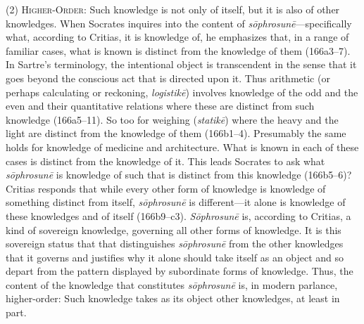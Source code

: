 (2) \textsc{Higher-Order}: Such knowledge is not only of itself, but it is also of other knowledges. When Socrates inquires into the content of \emph{sōphrosunē}—specifically what, according to Critias, it is knowledge of, he emphasizes that, in a range of familiar cases, what is known is distinct from the knowledge of them (166a3–7). In Sartre's terminology, the intentional object is transcendent in the sense that it goes beyond the conscious act that is directed upon it. Thus arithmetic (or perhaps calculating or reckoning, \emph{logistikē}) involves knowledge of the odd and the even and their quantitative relations where these are distinct from such knowledge (166a5–11). So too for weighing (\emph{statikē}) where the heavy and the light are distinct from the knowledge of them (166b1–4). Presumably the same holds for knowledge of medicine and architecture. What is known in each of these cases is distinct from the knowledge of it. This leads Socrates to ask what \emph{sōphrosunē} is knowledge of such that is distinct from this knowledge (166b5–6)? Critias responds that while every other form of knowledge is knowledge of something distinct from itself, \emph{sōphrosunē} is different—it alone is knowledge of these knowledges and of itself (166b9–c3). \emph{Sōphrosunē} is, according to Critias, a kind of sovereign knowledge, governing all other forms of knowledge. It is this sovereign status that that distinguishes \emph{sōphrosunē} from the other knowledges that it governs and justifies why it alone should take itself as an object and so depart from the pattern displayed by subordinate forms of knowledge. Thus, the content of the knowledge that constitutes \emph{sōphrosunē} is, in modern parlance, higher-order: Such knowledge takes as its object other knowledges, at least in part.

